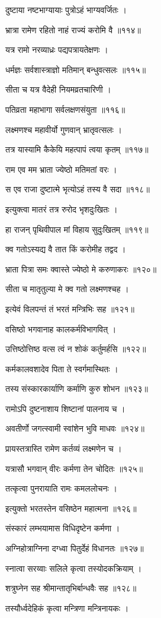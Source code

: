 दुष्टाया नष्टभाग्यायाः पुत्रोऽहं भाग्यवर्जितः ।

भ्रात्रा रामेण रहितो नाहं राज्यं करोमि वै ॥११४॥

यत्र रामो नरव्याध्रः पद्यपत्रायतेक्षणः ।

धर्मज्ञः सर्वशास्त्राज्ञो मतिमान् बन्धुवत्सलः ॥११५॥

सीता च यत्र वैदेही नियमव्रतचारिणी ।

पतिव्रता महाभागा सर्वलक्षणसंयुता ॥११६॥

लक्ष्मणश्च महावीर्यो गुणवान् भ्रातृवत्सलः ।

तत्र यास्यामि कैकेयि महत्पापं त्वया कृतम् ॥११७॥

राम एव मम भ्राता ज्येष्ठो मतिमतां वरः ।

स एव राजा दुष्टात्मे भृत्यो‍ऽहं तस्य वै सदा ॥११८॥

इत्युक्त्वा मातरं तत्र रुरोद भृशदुःखितः ।

हा राजन् पृथिवीपाल मां विहाय सुदुःखितम् ॥११९॥

क्व गतोऽस्यद्य वै तात किं करोमीह तद्वद ।

भ्राता पित्रा समः क्वास्ते ज्येष्ठो मे करुणाकरः ॥१२०॥

सीता च मातृतुल्या मे क्व गतो लक्ष्मणश्चह ।

इत्येवं विलपन्तं तं भरतं मन्त्रिभिः सह ॥१२१॥

वसिष्ठो भगवानाह कालकर्मविभागवित् ।

उत्तिष्ठोत्तिष्ठ वत्स त्वं न शोकं कर्तुमर्हसि ॥१२२॥

कर्मकालवशादेव पिता ते स्वर्गमास्थितः ।

तस्य संस्कारकार्याणि कर्माणि कुरु शोभन ॥१२३॥

रामोऽपि दुष्टनाशाय शिष्टानां पालनाय च ।

अवतीर्णो जगत्स्वामी स्वांशेन भुवि माधवः ॥१२४॥

प्रायस्तत्रास्ति रामेण कर्तव्यं लक्ष्मणेन च ।

यत्रासौ भगवान् वीरः कर्मणा तेन चोदितः ॥१२५॥

तत्कृत्वा पुनरायाति रामः कमललोचनः ।

इत्युक्तो भरतस्तेन वसिष्ठेन महात्मना ॥१२६॥

संस्कारं लम्भयामास विधिदृष्टेन कर्मणा ।

अग्निहोत्राग्निना दग्ध्वा पितुर्देहं विधानतः ॥१२७॥

स्नात्वा सरय्वाः सलिले कृत्वा तस्योदकक्रियाम् ।

शत्रुघ्नेन सह श्रीमान्तातृभिर्बान्धवैः सह ॥१२८॥

तस्यौर्ध्वदेहिकं कृत्वा मन्त्रिणा मन्त्रिनायकः ।

